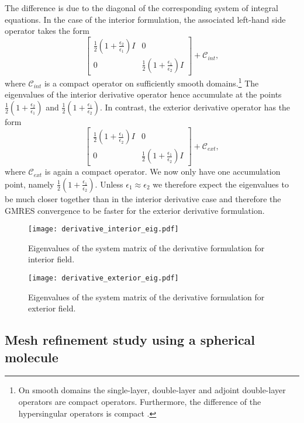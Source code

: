 The difference is due to the diagonal of the corresponding system of integral equations.
In the case of the interior formulation, the associated left-hand side operator takes the form
$$
\begin{bmatrix}\frac{1}{2}(1 + \frac{\epsilon_2}{\epsilon_1})I & 0 \\ 0 & \frac{1}{2}(1 + \frac{\epsilon_1}{\epsilon_2})I
\end{bmatrix} + \mathcal{C}_{int},
$$
where $\mathcal{C}_{int}$ is a compact operator on sufficiently smooth domains.\footnote{On smooth domains the single-layer, double-layer and adjoint double-layer operators are compact operators.
Furthermore, the difference of the hypersingular operators is compact \cite{Hiptmair2006-om}.}
The eigenvalues of the interior derivative operator hence accumulate at the points $\frac{1}{2}(1 + \frac{\epsilon_2}{\epsilon_1})$ and $\frac{1}{2}(1 + \frac{\epsilon_1}{\epsilon_2})$.
In contrast, the exterior derivative operator has the form
$$
\begin{bmatrix}\frac{1}{2}(1 + \frac{\epsilon_1}{\epsilon_2})I & 0 \\ 0 & \frac{1}{2}(1 + \frac{\epsilon_1}{\epsilon_2})I
\end{bmatrix} + \mathcal{C}_{ext},
$$
where $\mathcal{C}_{ext}$ is again a compact operator.
We now only have one accumulation point, namely $\frac{1}{2}(1 + \frac{\epsilon_1}{\epsilon_2})$.
Unless $\epsilon_1\approx \epsilon_2$ we therefore expect the eigenvalues to be much closer together than in the interior derivative case and therefore the GMRES convergence to be faster for the exterior derivative formulation.

\begin{figure}%
    \centering
    \texttt{[image: derivative\_interior\_eig.pdf]}
    \caption{Eigenvalues of the system matrix of the derivative formulation for interior field.}
    \label{fig:derivative_interior_eig}
\end{figure}

\begin{figure}%
    \centering
    \texttt{[image: derivative\_exterior\_eig.pdf]}
    \caption{Eigenvalues of the system matrix of the derivative formulation for exterior field.}
    \label{fig:derivative_exterior_eig}
\end{figure}

\subsection{Mesh refinement study using a spherical molecule}

